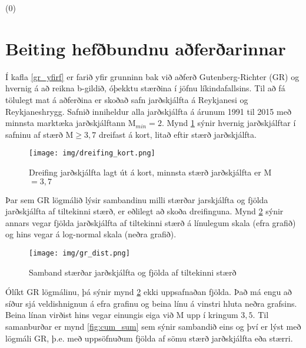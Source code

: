 \documentclass[10pt,a4paper,titlepage,twoside]{article}
\begin{document}
\if(0)
\clearpage
\section{Beiting hefðbundnu aðferðarinnar}\label{gr_main}

Í kafla \ref{gr_yfirf} er farið yfir grunninn bak við aðferð Gutenberg-Richter (GR) og hvernig á að reikna b-gildið, óþekktu stærðina í jöfnu líkindafallsins. Til að fá tölulegt mat á aðferðina er skoðað safn jarðskjálfta á Reykjanesi og Reykjaneshrygg. Safnið inniheldur alla jarðskjálfta á árunum 1991 til 2015 með minnsta marktæka jarðskjálftann M$_{min}=2$. Mynd \ref{fig:collect} sýnir hvernig jarðskjálftar í safninu af stærð M$\geq3,7$ dreifast á kort, litað eftir stærð jarðskjálfta.

\begin{figure}[h]
  \centering
  \texttt{[image: img/dreifing\_kort.png]}
  \vspace{-4mm}
  \caption{Dreifing jarðskjálfta lagt út á kort, minnsta stærð jarðskjálfta er M$=3,7$}
  \label{fig:collect}
\end{figure}

Þar sem GR lögmálið lýsir sambandinu milli stærðar jarskjálfta og fjölda jarðskjálfta af tiltekinni stærð, er eðlilegt að skoða dreifinguna. Mynd \ref{fig:gr_dist} sýnir annars vegar fjölda jarðskjálfta af tiltekinni stærð á línulegum skala (efra grafið) og hins vegar á log-normal skala (neðra grafið).

\begin{figure}[h]
  \centering
  \texttt{[image: img/gr\_dist.png]}
  \vspace{-4mm}
  \caption{Samband stærðar jarðskjálfta og fjölda af tiltekinni stærð}
  \label{fig:gr_dist}
\end{figure}

Ólíkt GR lögmálinu, þá sýnir mynd \ref{fig:gr_dist} ekki uppsafnaðan fjölda. Það má engu að síður sjá veldishnignun á efra grafinu og beina línu á vinstri hluta neðra grafsins. Beina línan virðist hins vegar einungis eiga við M upp í kringum $3,5$. Til samanburðar er mynd \ref{fig:cum_sum} sem sýnir sambandið eins og því er lýst með lögmáli GR, þ.e. með uppsöfnuðum fjölda af sömu stærð jarðskjálfta eða stærri.

\end{document}
